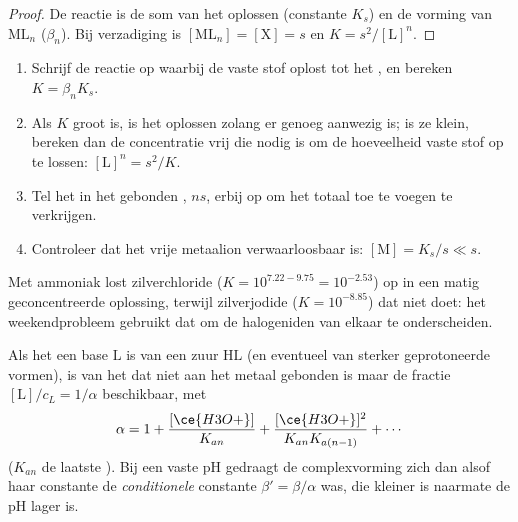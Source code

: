 \begin{proof}
De reactie is de som van het oplossen (constante $K_s$) en de vorming van
$\mathrm{ML}_n$ ($\beta_n$). Bij verzadiging is $[\mathrm{ML}_n]
= [\mathrm{X}] = s$ en $K = s^2/[\mathrm{L}]^n$.
\end{proof}

\begin{method}\label{met:b1:complexation:dissolve-precipitate}
\begin{enumerate}
  \item Schrijf de reactie op waarbij de vaste stof oplost tot het
        , en bereken $K = \beta_n K_s$.
  \item Als $K$ groot is, is het oplossen  zolang er genoeg
         aanwezig is; is ze klein, bereken dan de concentratie
        vrij  die nodig is om de hoeveelheid vaste stof op te
        lossen: $[\mathrm{L}]^n = s^2/K$.
  \item Tel het in het  gebonden , $n s$, erbij op om het
        totaal toe te voegen  te verkrijgen.
  \item Controleer dat het vrije metaalion verwaarloosbaar is: $[\mathrm{M}] = K_s/s
        \ll s$.
\end{enumerate}
\end{method}

Met ammoniak lost zilverchloride ($K = 10^{7.22 - 9.75} = 10^{-2.53}$) op
in een matig geconcentreerde oplossing, terwijl zilverjodide
($K = 10^{-8.85}$) dat niet doet: het weekendprobleem gebruikt dat om de
halogeniden van elkaar te onderscheiden.

\begin{proposition}\label{prop:b1:complexation:ligand-acidity}
Als het  een base $\mathrm{L}$ is van een zuur $\mathrm{HL}$ (en
eventueel van sterker geprotoneerde vormen), is van het  dat niet
aan het metaal gebonden is maar de fractie $[\mathrm{L}]/c_L =
1/\alpha$ beschikbaar, met
\[
  \alpha = 1 + \frac{[\ce{H3O+}]}{K_{an}} + \frac{[\ce{H3O+}]^2}{K_{an}K_{a(n-1)}}
  + \cdots
\]
($K_{an}$ de laatste ). Bij een vaste pH gedraagt de
complexvorming zich dan alsof haar constante de \emph{conditionele}
constante $\beta' = \beta/\alpha$ was, die kleiner is naarmate de pH
lager is.
\end{proposition}

